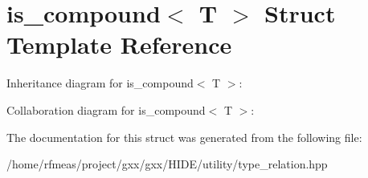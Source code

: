 \hypertarget{structis__compound}{}\section{is\+\_\+compound$<$ T $>$ Struct Template Reference}
\label{structis__compound}


Inheritance diagram for is\+\_\+compound$<$ T $>$\+:


Collaboration diagram for is\+\_\+compound$<$ T $>$\+:


The documentation for this struct was generated from the following file\+:\begin{DoxyCompactItemize}
\item 
/home/rfmeas/project/gxx/gxx/\+H\+I\+D\+E/utility/type\+\_\+relation.\+hpp\end{DoxyCompactItemize}
